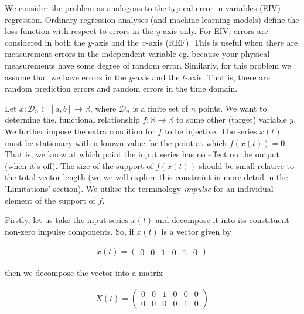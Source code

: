 \documentclass[11pt]{amsart}
\begin{document}
We consider the problem as analogous to the typical error-in-variables (EIV) regression. Ordinary regression analyses (and machine learning models) define the loss function with respect to errors in the $y$ axis only. For EIV, errors are considered in both the $y$-axis and the $x$-axis (REF). This is useful when there are measurement errors in the independent variable eg. because your physical measurements have some degree of random error. Similarly, for this problem we assume that we have errors in the $y$-axis and the $t$-axis. That is, there are random prediction errors and random errors in the time domain. 

Let $x: \mathcal{D}_n\subset [a, b] \longrightarrow \mathbb{R}$, where $\mathcal{D}_n$ is a finite set of $n$ points. We want to determine the, functional relationship $f:\mathbb{R} \longrightarrow \mathbb{R}$ to some other (target) variable $y$. We further impose the extra condition for $f$ to be injective.  The series $x(t)$ must be stationary with a known value for the point at which $f(x(t)) = 0$.  That is, we know at which point the input series has no effect on the output (when it’s off). The size of the support of $f(x(t))$ should be small relative to the total vector length (we we will explore this constraint in more detail in the 'Limitations' section). We utilise the terminology {\em impulse} for an individual element of the support of $f$.



Firstly, let us take the input series $x(t)$ and decompose it into its constituent non-zero impulse components. So, if $x(t)$ is a vector given by 

\begin{align}
x(t) = 
\left(
\begin{array}{cccccc}
0 & 0 & 1 & 0 & 1 & 0
\end{array}  
\right)
\end{align}

then we decompose the vector into a matrix 

\begin{align}
X(t) = 
\left(
\begin{array}{cccccc}
0 & 0 & 1 & 0 & 0 & 0 \\
0 & 0 & 0 & 0 & 1 & 0 
\end{array}  
\right)
\end{align}
\end{document}
